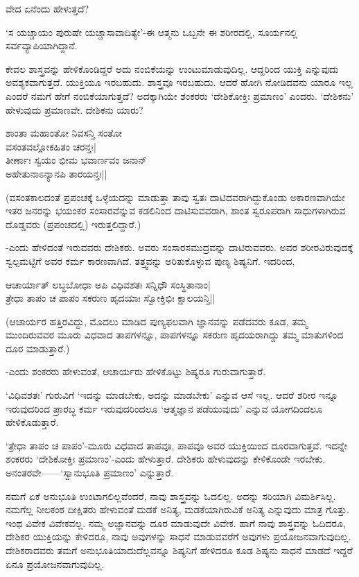 ವೇದ ಏನೆಂದು ಹೇಳುತ್ತದೆ?

`ಸ ಯಚ್ಚಾಯಂ ಪುರುಷೇ ಯಚ್ಚಾಸಾವಾದಿತ್ಯೇ'-ಈ ಆತ್ಮನು ಒಬ್ಬನೇ ಈ ಶರೀರದಲ್ಲಿ, ಸೂರ್ಯನಲ್ಲಿ ಸರ್ವವ್ಯಾಪಿಯಾಗಿದ್ದಾನೆ.

ಕೇವಲ ಶಾಸ್ತ್ರವನ್ನು ಹೇಳಿಕೊಂಡಿದ್ದರೆ ಅದು ನಂಬಿಕೆಯನ್ನು ಉಂಟುಮಾಡುವುದಿಲ್ಲ. ಆದ್ದರಿಂದ ಯುಕ್ತಿ ಎನ್ನುವುದು ಅವಶ್ಯಕವಾಗುತ್ತದೆ. ಯುಕ್ತಿಯೂ ಇರಬಹುದು. ಶಾಸ್ತ್ರವೂ ಇರಬಹುದು. ಆದರೆ ಹೋಗಿ ನೋಡಿದವನು ಯಾರೂ ಇಲ್ಲ ಎಂದರೆ ನಮಗೆ ಹೇಗೆ ನಂಬಿಕೆಯಾಗುತ್ತದೆ? ಅದಕ್ಕಾಗಿಯೇ ಶಂಕರರು `ದೇಶಿಕೋಕ್ತಿಃ ಪ್ರಮಾಣಂ' ಎಂದರು. `ದೇಶಿಕನು' ಹೇಳುವುದು ಪ್ರಮಾಣವೇ. ದೇಶಿಕನು ಯಾರು?

\begin{shloka}
ಶಾಂತಾ ಮಹಾಂತೋ ನಿವಸನ್ತಿ ಸಂತೋ\\
ವಸಂತವಲ್ಲೋಕಹಿತಂ ಚರನ್ತಃ|\\
ತೀರ್ಣಾಃ ಸ್ವಯಂ ಭೀಮ ಭವಾರ್ಣವಂ ಜನಾನ್\\
ಅಹೇತುನಾಽನ್ಯಾನಪಿ ತಾರಯನ್ತಃ||
\end{shloka}

(ವಸಂತಕಾಲದಂತೆ ಪ್ರಪಂಚಕ್ಕೆ ಒಳ್ಳೆಯದನ್ನು ಮಾಡುತ್ತಾ ತಾವು ಸ್ವತಃ ದಾಟಿದವರಾಗಿದ್ದುಕೊಂಡು ಅಕಾರಣವಾಗಿಯೇ ಇತರ ಜನರನ್ನು ಭಯಂಕರ ಸಂಸಾರವೆನ್ನುವ ಕಡಲಿನಿಂದ ದಾಟಿಸುವವರಾಗಿ, ಶಾಂತ ಸ್ವರೂಪರಾಗಿ ಸಾಧುಗಳಾಗಿರುವ ದೊಡ್ಡವರು (ಪ್ರಪಂಚದಲ್ಲಿ) ಇರುತ್ತಲಿದ್ದಾರೆ.)

-ಎಂದು ಹೇಳಿದಂತೆ ಇರುವವರು ದೇಶಿಕರು. ಅವರು ಸಂಸಾರಸಮುದ್ರವನ್ನು ದಾಟಿರುವವರು. ಅವರ ಶರೀರವಿರುವುದಕ್ಕೆ ಸ್ವಲ್ಪಮಟ್ಟಿಗೆ ಅವರ ಕರ್ಮ ಕಾರಣವಾಗಿದೆ. ತತ್ತ್ವವನ್ನು ಅರಿತುಕೊಳ್ಳುವ ಪುಣ್ಯ ಶಿಷ್ಯನಿಗೆ. ಇದರಿಂದ,

\begin{shloka}
ಆಚಾರ್ಯಾತ್ ಲಬ್ಧಬೋಧಾ ಅಪಿ ವಿಧಿವಶತಃ ಸನ್ನಿಧೌ ಸಂಸ್ಥಿತಾನಾಂ|\\
ತ್ರೇಧಾ ತಾಪಂ ಚ ಪಾಪಂ ಸಕರುಣ ಹೃದಯಾಃ ಸ್ವೋಕ್ತಿಭಿಃ ಕ್ಷಾಲಯನ್ತಿ||
\end{shloka}

(ಆಚಾರ್ಯರ ಹತ್ತಿರವಿದ್ದು, ಮೊದಲು ಮಾಡಿದ ಪುಣ್ಯಫಲವಾಗಿ ಜ್ಞಾನವನ್ನು ಪಡೆದವರು ಕೂಡ, ತಮ್ಮ ಮುಂದಿರುವವರ ಮೂರು ವಿಧವಾದ ತಾಪಗಳನ್ನೂ, ಪಾಪಗಳನ್ನೂ ಸಕರುಣ ಹೃದಯರಾಗಿದ್ದು ತಮ್ಮ ಮಾತುಗಳಿಂದ ದೂರ ಮಾಡುತ್ತಾರೆ.)

-ಎಂದು ಶಂಕರರು ಹೇಳುವಂತೆ, ಆಚಾರ್ಯರು ಹೇಳಿಕೊಟ್ಟು ಶಿಷ್ಯರೂ ಗುರುವಾಗುತ್ತಾರೆ.

`ವಿಧಿವಶತಃ' ಗುರುವಿಗೆ `ಇದನ್ನು ಮಾಡಬೇಕು, ಅದನ್ನು ಮಾಡಬೇಕು' ಎನ್ನುವ ಆಸೆ ಇಲ್ಲ. ಆದರೆ ಶರೀರ ಇನ್ನೂ ಇರುವುದರಿಂದ ಪ್ರಾರಬ್ಧ ಕರ್ಮ ಇರುವುದರಿಂದಲೂ `ಆತ್ಮಜ್ಞಾನ ಪಡೆಯುವುದು' ಎನ್ನುವ ಯೋಗದಿಂದಲೂ ಹೇಳಿಕೊಡುತ್ತಾರೆ.

`ತ್ರೇಧಾ ತಾಪಂ ಚ ಪಾಪಂ'-ಮೂರು ವಿಧವಾದ ತಾಪವೂ, ಪಾಪವೂ ಅವರ ಯುಕ್ತಿಯಿಂದ ದೂರವಾಗುತ್ತವೆ. ಇದನ್ನೇ ಶಂಕರರು `ದೇಶಿಕೋಕ್ತಿಃ ಪ್ರಮಾಣಂ'-ಎಂದು ಹೇಳುತ್ತಾರೆ. ದೇಶಿಕರು ಹೇಳುವುದನ್ನು ಕೇಳಿಕೊಂಡೇ ಇರಬೇಕು. ಅನಂತರವೇ------`ಸ್ವಾನುಭೂತಿ ಪ್ರಮಾಣಂ' ಎನ್ನುತ್ತಾರೆ.

ನಮಗೆ ಏಕೆ ಅನುಭೂತಿ ಉಂಟಾಗಲಿಲ್ಲವೆಂದರೆ, ನಾವು ಶಾಸ್ತ್ರವನ್ನು ಓದಲಿಲ್ಲ. ಅದನ್ನು ಸರಿಯಾಗಿ ವಿಮರ್ಶಿಸಿಲ್ಲ. ನಮಗೆಲ್ಲ ನೀಲಕಂಠ ದೀಕ್ಷಿತರು ಹೇಳುವಂತೆ ಮಡಕೆ ಅನಿತ್ಯ, ಮಡಕೆಯಾಗಿರುವಿಕೆ ಅನಿತ್ಯ ಎನ್ನುವುದು ಮಾತ್ರ ಗೊತ್ತು. ಇಂಥ ವಿವೇಕ ವಿವೇಕವಲ್ಲ. ನಮ್ಮ ಅಜ್ಞಾನವನ್ನು ದೂರ ಮಾಡುವುದೇ ವಿವೇಕ. ಹಾಗೆ ನಾವು ಶಾಸ್ತ್ರವನ್ನು ಓದಿದರೂ, ದೇಶಿಕರ ಯುಕ್ತಿಯನ್ನು ಕೇಳಿದರೂ, ನಾವು ಅವುಗಳನ್ನು ಸಾಧನೆ ಮಾಡುವವರೆಗೆ ಅವುಗಳು ಪ್ರಯೋಜನವಾಗುವುದಿಲ್ಲ. ದೇಶಿಕರಾದವರು ತಮಗೆ ಅನುಭೂತಿಯಾದುದೆಲ್ಲವನ್ನೂ ಶಿಷ್ಯನಿಗೆ ಹೇಳಿದರೂ ಕೂಡ ಶಿಷ್ಯನು ಸಾಧನೆ ಮಾಡದೆ ಇದ್ದರೆ ಏನೂ ಪ್ರಯೋಜನವಾಗುವುದಿಲ್ಲ.

